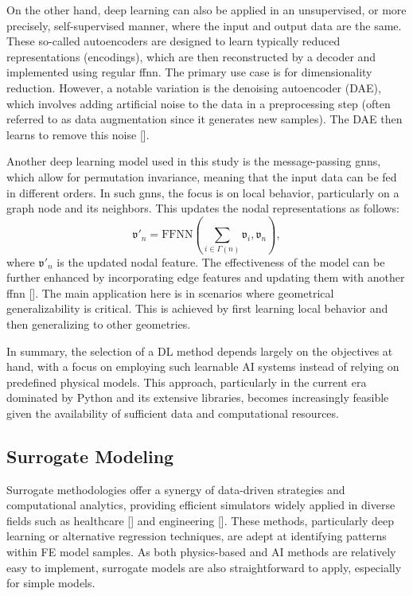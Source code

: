 \documentclass[12pt,a4paper]{report}
\begin{document}
On the other hand, deep learning can also be applied in an unsupervised, or more precisely, self-supervised manner, where the input and output data are the same. These so-called autoencoders are designed to learn typically reduced representations (encodings), which are then reconstructed by a decoder and implemented using regular \ac{ffnn}. The primary use case is for dimensionality reduction. However, a notable variation is the denoising autoencoder (DAE), which involves adding artificial noise to the data in a preprocessing step (often referred to as data augmentation since it generates new samples). The DAE then learns to remove this noise [\cite{hinton2006,vincent2008}].

Another deep learning model used in this study is the message-passing \acp{gnn}, which allow for permutation invariance, meaning that the input data can be fed in different orders. In such \acp{gnn}, the focus is on local behavior, particularly on a graph node and its neighbors. This updates the nodal representations as follows:
%
\begin{equation}
\label{eq:gnn}
\mathfrak{v}'_n = \text{FFNN} \left(\sum_{i \in \Gamma(n)}\mathfrak{v}_i, \mathfrak{v}_n\right),
\end{equation}
%
where $\mathfrak{v}'_n$ is the updated nodal feature. The effectiveness of the model can be further enhanced by incorporating edge features and updating them with another \ac{ffnn} [\cite{cai2018,zhou2020,wu2021}]. The main application here is in scenarios where geometrical generalizability is critical. This is achieved by first learning local behavior and then generalizing to other geometries.

In summary, the selection of a DL method depends largely on the objectives at hand, with a focus on employing such learnable AI systems instead of relying on predefined physical models. This approach, particularly in the current era dominated by Python and its extensive libraries, becomes increasingly feasible given the availability of sufficient data and computational resources.

\subsection{Surrogate Modeling}
%
Surrogate methodologies offer a synergy of data-driven strategies and computational analytics, providing efficient simulators widely applied in diverse fields such as healthcare [\cite{holzapfel2021,shim2020,liang2018b}] and engineering [\cite{pfaff2021,gao2020b,kalyuzhnyuk2019}]. These methods, particularly deep learning or alternative regression techniques, are adept at identifying patterns within FE model samples. As both physics-based and AI methods are relatively easy to implement, surrogate models are also straightforward to apply, especially for simple models.
\end{document}
